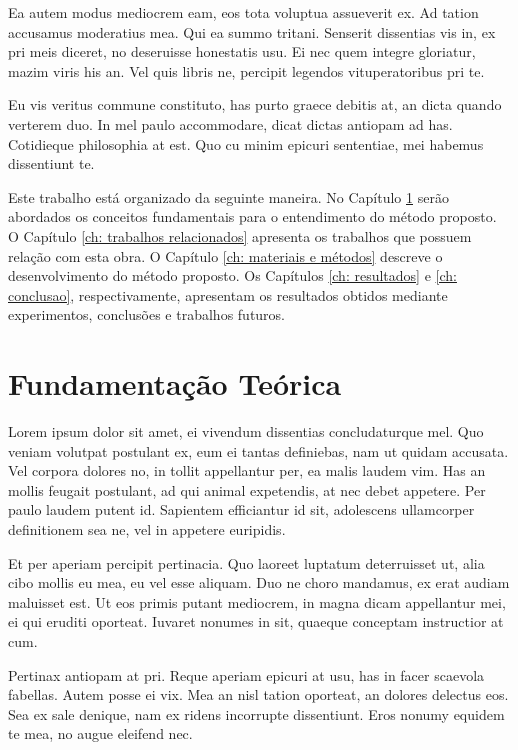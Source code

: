 \documentclass[
	12pt,				%
	openright,			%
	oneside,			%
	a4paper,			%
	english,			%
	french,				%
	spanish,			%
	brazil,				%
	]{abntex2}
\begin{document}
Ea autem modus mediocrem eam, eos tota voluptua assueverit ex. Ad tation accusamus moderatius mea. Qui ea summo tritani. Senserit dissentias vis in, ex pri meis diceret, no deseruisse honestatis usu. Ei nec quem integre gloriatur, mazim viris his an. Vel quis libris ne, percipit legendos vituperatoribus pri te.

Eu vis veritus commune constituto, has purto graece debitis at, an dicta quando verterem duo. In mel paulo accommodare, dicat dictas antiopam ad has. Cotidieque philosophia at est. Quo cu minim epicuri sententiae, mei habemus dissentiunt te.

Este trabalho está organizado da seguinte maneira. No Capítulo \ref{ch: fundamentacao teorica} serão abordados os conceitos fundamentais para o entendimento do método proposto. O Capítulo \ref{ch: trabalhos relacionados} apresenta os trabalhos que possuem relação com esta obra. O Capítulo \ref{ch: materiais e métodos} descreve o desenvolvimento do método proposto. Os Capítulos \ref{ch: resultados} e \ref{ch: conclusao}, respectivamente, apresentam os resultados obtidos mediante experimentos, conclusões e trabalhos futuros.


\setcounter{chapter}{1}
\chapter{Fundamentação Teórica}
\label{ch: fundamentacao teorica}

Lorem ipsum dolor sit amet, ei vivendum dissentias concludaturque mel. Quo veniam volutpat postulant ex, eum ei tantas definiebas, nam ut quidam accusata. Vel corpora dolores no, in tollit appellantur per, ea malis laudem vim. Has an mollis feugait postulant, ad qui animal expetendis, at nec debet appetere. Per paulo laudem putent id. Sapientem efficiantur id sit, adolescens ullamcorper definitionem sea ne, vel in appetere euripidis.

Et per aperiam percipit pertinacia. Quo laoreet luptatum deterruisset ut, alia cibo mollis eu mea, eu vel esse aliquam. Duo ne choro mandamus, ex erat audiam maluisset est. Ut eos primis putant mediocrem, in magna dicam appellantur mei, ei qui eruditi oporteat. Iuvaret nonumes in sit, quaeque conceptam instructior at cum.

Pertinax antiopam at pri. Reque aperiam epicuri at usu, has in facer scaevola fabellas. Autem posse ei vix. Mea an nisl tation oporteat, an dolores delectus eos. Sea ex sale denique, nam ex ridens incorrupte dissentiunt. Eros nonumy equidem te mea, no augue eleifend nec.
\end{document}
